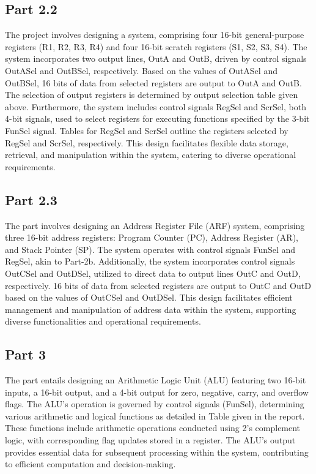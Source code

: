 \documentclass[pdftex,12pt,a4paper]{article}
\begin{document}
\subsection{Part 2.2}
The project involves designing a system, comprising four 16-bit general-purpose registers (R1, R2, R3, R4) and four 16-bit scratch registers (S1, S2, S3, S4). The system incorporates two output lines, OutA and OutB, driven by control signals OutASel and OutBSel, respectively. Based on the values of OutASel and OutBSel, 16 bits of data from selected registers are output to OutA and OutB. The selection of output registers is determined by output selection table given above. Furthermore, the system includes control signals RegSel and ScrSel, both 4-bit signals, used to select registers for executing functions specified by the 3-bit FunSel signal. Tables for RegSel and ScrSel outline the registers selected by RegSel and ScrSel, respectively. This design facilitates flexible data storage, retrieval, and manipulation within the system, catering to diverse operational requirements.
\subsection{Part 2.3}
The part involves designing an Address Register File (ARF) system, comprising three 16-bit address registers: Program Counter (PC), Address Register (AR), and Stack Pointer (SP). The system operates with control signals FunSel and RegSel, akin to Part-2b. Additionally, the system incorporates control signals OutCSel and OutDSel, utilized to direct data to output lines OutC and OutD, respectively. 16 bits of data from selected registers are output to OutC and OutD based on the values of OutCSel and OutDSel. This design facilitates efficient management and manipulation of address data within the system, supporting diverse functionalities and operational requirements.
\subsection{Part 3}
The part entails designing an Arithmetic Logic Unit (ALU) featuring two 16-bit inputs, a 16-bit output, and a 4-bit output for zero, negative, carry, and overflow flags. The ALU's operation is governed by control signals (FunSel), determining various arithmetic and logical functions as detailed in Table given in the report. These functions include arithmetic operations conducted using 2’s complement logic, with corresponding flag updates stored in a register. The ALU's output provides essential data for subsequent processing within the system, contributing to efficient computation and decision-making.
\end{document}
